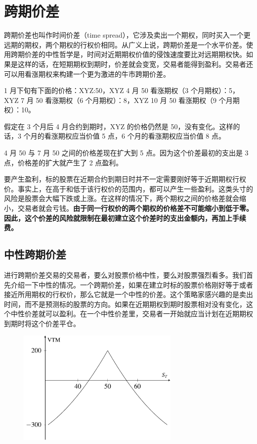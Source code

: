 \chapter{跨期价差}
跨期价差也叫作时间价差（time spread），它涉及卖出一个期权，同时买入一个更远期的期权，两个期权的行权价相同。从广义上说，跨期价差是一个水平价差。使用跨期价差的中性哲学是，时间对近期期权价值的侵蚀速度要比对远期期权快。如果是这样的话，在短期期权到期时，价差就会变宽，交易者能得到盈利。交易者还可以用看涨期权来构建一个更为激进的牛市跨期价差。

1 月下旬有下面的价格：XYZ:50，XYZ 4 月 50 看涨期权（3 个月期权）：5，XYZ 7 月 50 看涨期权（6 个月期权）：8，XYZ 10 月 50 看涨期权（9 个月期权）：10。

假定在 3 个月后 4 月合约到期时，XYZ 的价格仍然是 50，没有变化。这样的话，3 个月的看涨期权应当价值 5 点，6 个月的看涨期权应当价值 8 点。

4 月 50 与 7 月 50 之间的价格差现在扩大到 5 点。因为这个价差最初的支出是 3 点，价格差的扩大就产生了 2 点盈利。

要产生盈利，标的股票在近期合约到期日时并不一定需要刚好等于近期期权行权价。事实上，在高于和低于该行权价的范围内，都可以产生一些盈利。这类头寸的风险是股票会大幅下跌或上涨。在这样的情况下，两个期权之间的价格差就会缩小，交易者就会亏钱。\textbf{由于同一行权价的两个期权的价格差不可能缩小到低于零。因此，这个价差的风险就限制在最初建立这个价差时的支出金额内，再加上手续费。}

\section{中性跨期价差}
进行跨期价差交易的交易者，要么对股票价格中性，要么对股票强烈看多。我们首先介绍一下中性的情况。一个跨期价差，如果在建立时标的股票价格刚好等于或者接近所用期权的行权价，那么它就是一个中性的价差。这个策略家感兴趣的是卖出时间，而不是预测标的股票的方向。如果在近期期权到期时股票相对没有变化，这个中性价差就可以盈利。在一个中性价差里，交易者一开始就应当计划在近期期权到期时将这个价差平仓。


\begin{figure}[h]
    \centering
    \includegraphics[width=0.7\textwidth]{IMG/Calendar spread at near-term expiration.pdf}
    \label{fig:calendar spreads}
\end{figure}